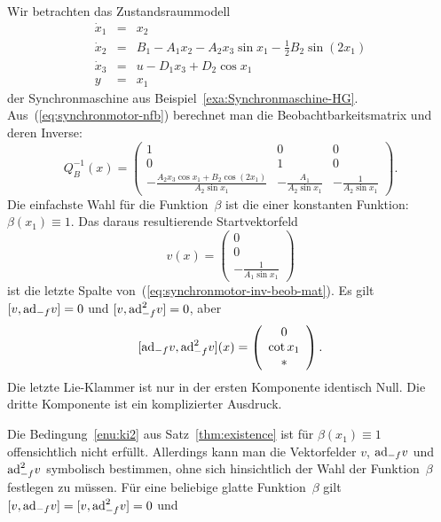\begin{example}
\label{exa:Synchronmaschine-ELO}Wir betrachten das Zustandsraummodell
\begin{equation}
\begin{array}{lcl}
\dot{x}_{1} & = & x_{2}\\
\dot{x}_{2} & = & B_{1}-A_{1}x_{2}-A_{2}x_{3}\sin x_{1}-\tfrac{1}{2}B_{2}\sin(2x_{1})\\
\dot{x}_{3} & = & u-D_{1}x_{3}+D_{2}\cos x_{1}\\
y & = & x_{1}
\end{array}\label{eq:synchronmotor-nfb}
\end{equation}
der Synchronmaschine aus Beispiel~\ref{exa:Synchronmaschine-HG}.
Aus~(\ref{eq:synchronmotor-nfb}) berechnet man die Beobachtbarkeitsmatrix
und deren Inverse:
\begin{equation}
Q_{B}^{-1}(x)=\left(\begin{array}{ccc}
1 & 0 & 0\\
0 & 1 & 0\\
-\frac{A_{2}x_{3}\cos x_{1}+B_{2}\cos(2x_{1})}{A_{2}\sin x_{1}} & -\frac{A_{1}}{A_{2}\sin x_{1}} & -\frac{1}{A_{2}\sin x_{1}}
\end{array}\right).\label{eq:synchronmotor-inv-beob-mat}
\end{equation}
Die einfachste Wahl für die Funktion~$\beta$ ist die einer konstanten
Funktion: $\beta(x_{1})\equiv1$. Das daraus resultierende Startvektorfeld
\begin{equation}
v(x)=\left(\begin{array}{c}
0\\
0\\
-\frac{1}{A_{1}\sin x_{1}}
\end{array}\right)\label{eq:synchronmotor-va}
\end{equation}
ist die letzte Spalte von~(\ref{eq:synchronmotor-inv-beob-mat}).
Es gilt $[v,{\operatorname{ad}}_{-f}v]=0$ und $[v,{\operatorname{ad}}_{-f}^{2}v]=0$, aber 
\[
[{\operatorname{ad}}_{-f}v,{\operatorname{ad}}_{-f}^{2}v](x)=\left(\begin{array}{c}
0\\
\cot x_{1}\\
*
\end{array}\right).
\]
Die letzte Lie-Klammer ist nur in der ersten Komponente identisch
Null. Die dritte Komponente ist ein komplizierter Ausdruck. 

Die Bedingung~\ref{enu:ki2} aus Satz~\ref{thm:existence} ist für
$\beta(x_{1})\equiv1$ offensichtlich nicht erfüllt. Allerdings kann
man die Vektorfelder $v$, ${\operatorname{ad}}_{-f}v$ und ${\operatorname{ad}}_{-f}^{2}v$ symbolisch
bestimmen, ohne sich hinsichtlich der Wahl der Funktion~$\beta$
festlegen zu müssen. Für eine beliebige glatte Funktion~$\beta$
gilt $[v,{\operatorname{ad}}_{-f}v]=[v,{\operatorname{ad}}_{-f}^{2}v]=0$ und 
\end{example}
